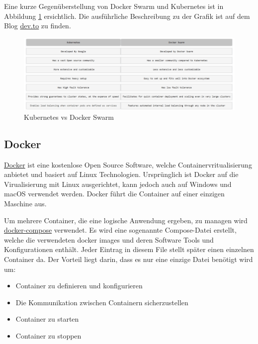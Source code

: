 Eine kurze Gegen{\"u}berstellung von Docker Swarm und Kubernetes ist in Abbildung \ref{fig:kub_vs_dokcer} ersichtlich. Die ausf{\"u}hrliche Beschreibung zu der Grafik ist auf dem Blog  \href{https://dev.to/totalcloudio/docker-swarm-vs-kubernetes--what-you-really-need-to-know--4kjb}{dev.to} zu finden.

\begin{figure}[H]
	\centering
		\includegraphics[scale=0.5 ]{images/docker_kubernetes.png}
	\caption{Kubernetes vs Docker Swarm}

	\label{fig:kub_vs_dokcer}
\end{figure}

\subsection{Docker}
\label{sec:Docker}
 \href{https://www.docker.com}{Docker} ist eine kostenlose Open Source Software, welche Containervritualisierung anbietet und basiert auf Linux Technologien. Urspr{\"u}nglich ist Docker auf die Virualisierung mit Linux ausgerichtet, kann jedoch auch auf Windows und macOS verwendet werden. Docker f{\"u}hrt die Container auf einer einzigen Maschine aus. 

Um mehrere Container, die eine logische Anwendung ergeben, zu managen wird \href{https://docs.docker.com/compose/}{docker-compose} verwendet. Es wird eine sogenannte Compose-Datei erstellt, welche die verwendeten docker images und deren Software Tools und Konfigurationen enth{\"a}lt. Jeder Eintrag in diesem File stellt sp{\"a}ter einen einzelnen Container da. Der Vorteil liegt darin, dass es nur eine einzige Datei ben{\"o}tigt wird um:

\begin{itemize}
  \item Container zu definieren und konfigurieren
  \item Die Kommunikation zwischen Containern sicherzustellen
  \item Container zu starten
  \item Container zu stoppen
\end{itemize}
 
